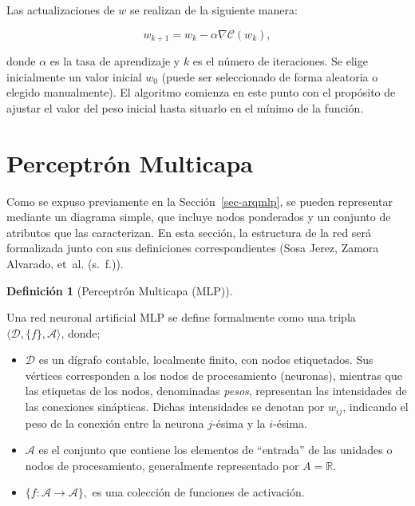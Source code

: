 \documentclass[
  us-letterpaper,
]{scrreprt}
\theoremstyle{plain}
\theoremstyle{definition}
\newtheorem{definition}{Definición}[chapter]
\theoremstyle{definition}
\theoremstyle{plain}
\theoremstyle{remark}
\begin{document}
Las actualizaciones de \(w\) se realizan de la siguiente manera:

\[w_{k+1} = w_k - \alpha \nabla\mathcal C(w_k),\]

donde \(\alpha\) es la tasa de aprendizaje y \(k\) es el número de
iteraciones. Se elige inicialmente un valor inicial \(w_0\) (puede ser
seleccionado de forma aleatoria o elegido manualmente). El algoritmo
comienza en este punto con el propósito de ajustar el valor del peso
inicial hasta situarlo en el mínimo de la función.

\section{Perceptrón Multicapa}\label{perceptruxf3n-multicapa}

Como se expuso previamente en la Sección~\ref{sec-arqmlp}, se pueden
representar mediante un diagrama simple, que incluye nodos ponderados y
un conjunto de atributos que las caracterizan. En esta sección, la
estructura de la red será formalizada junto con sus definiciones
correspondientes (Sosa Jerez, Zamora Alvarado, et~al. (s.~f.)).

\begin{definition}[Perceptrón Multicapa
(MLP)]\protect\hypertarget{def-mlp}{}\label{def-mlp}

Una red neuronal artificial MLP se define formalmente como una tripla
\(\langle\mathscr D, \{f\}, \mathscr A\rangle\), donde;

\begin{itemize}
\item
  \(\mathscr D\) es un dígrafo contable, localmente finito, con nodos
  etiquetados. Sus vértices corresponden a los nodos de procesamiento
  (neuronas), mientras que las etiquetas de los nodos, denominadas
  \emph{pesos}, representan las intensidades de las conexiones
  sinápticas. Dichas intensidades se denotan por \(w_{ij}\), indicando
  el peso de la conexión entre la neurona \(j\)-ésima y la \(i\)-ésima.
\item
  \(\mathscr A\) es el conjunto que contiene los elementos de
  ``entrada'' de las unidades o nodos de procesamiento, generalmente
  representado por \(A =\mathbb R\).
\item
  \(\{f: \mathscr A\to\mathscr A\},\) es una colección de funciones de
  activación.
\end{itemize}

\end{definition}
\end{document}
